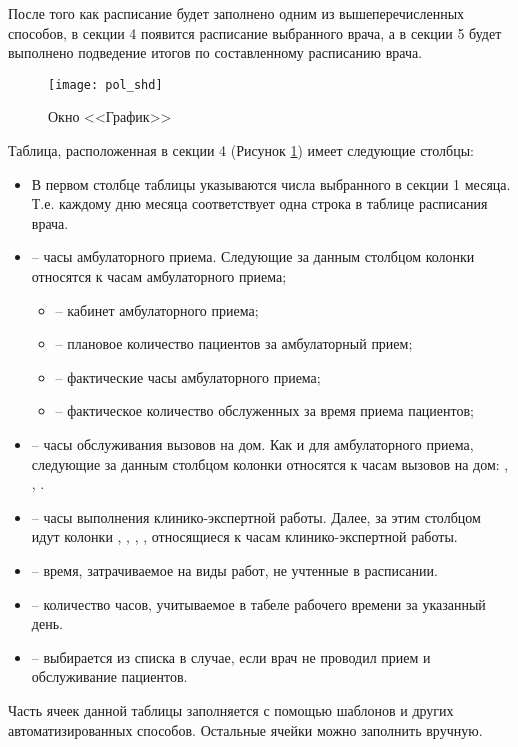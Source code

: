 После того как расписание будет заполнено одним из вышеперечисленных способов, в секции 4 появится расписание выбранного врача, а в секции 5 будет выполнено подведение итогов по составленному расписанию врача.

\begin{figure}[ht]\centering
 \texttt{[image: pol\_shd]}
 \caption{Окно <<График>>}
 \label{img_pol_shd}
\end{figure}

Таблица, расположенная в секции 4 (Рисунок \ref{img_pol_shd}) имеет следующие столбцы:
\begin{itemize}
 \item В первом столбце таблицы указываются числа выбранного в секции 1 месяца. Т.е. каждому дню месяца соответствует одна строка в таблице расписания врача.
 \item {} – часы амбулаторного приема. Следующие за данным столбцом колонки относятся к часам амбулаторного приема;
 \begin{itemize}
  \item {} – кабинет амбулаторного приема;
  \item {} – плановое количество пациентов за амбулаторный прием;
  \item {} – фактические часы амбулаторного приема;
  \item {} – фактическое количество обслуженных за время приема пациентов;
 \end{itemize} 
 \item {} – часы обслуживания вызовов на дом. Как и для амбулаторного приема, следующие за данным столбцом колонки относятся к часам вызовов на дом: , , .
 \item {} – часы выполнения клинико-экспертной работы. Далее, за этим столбцом идут колонки , , , , относящиеся к часам клинико-экспертной работы.
 \item {} – время, затрачиваемое на виды работ, не учтенные в расписании.
 \item {} – количество часов, учитываемое в табеле рабочего времени за указанный день.
 \item {} – выбирается из списка в случае, если врач не проводил прием и обслуживание пациентов.
\end{itemize}
 
Часть ячеек данной таблицы заполняется с помощью шаблонов и других автоматизированных способов. Остальные ячейки можно заполнить вручную.

